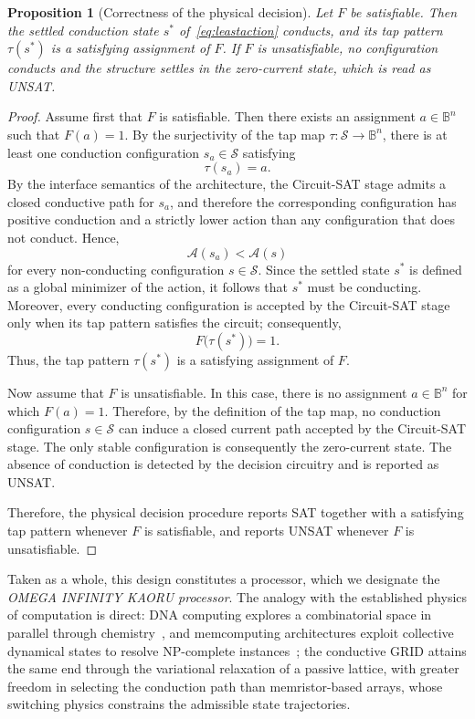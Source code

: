 \documentclass[letterpaper,journal]{IEEEtran}
\newtheorem{proposition}{Proposition}
\begin{document}
\begin{proposition}[Correctness of the physical decision]
\label{prop:correct}
Let $F$ be satisfiable. Then the settled conduction state $s^{*}$
of~\eqref{eq:leastaction} conducts, and its tap pattern $\tau(s^{*})$ is a
satisfying assignment of $F$. If $F$ is unsatisfiable, no configuration
conducts and the structure settles in the zero-current state, which is read
as UNSAT.
\end{proposition}

\begin{proof}
Assume first that $F$ is satisfiable. Then there exists an assignment
$a\in\mathbb{B}^{n}$ such that $F(a)=1$. By the surjectivity of the tap
map $\tau:\mathcal{S}\to\mathbb{B}^{n}$, there is at least one conduction
configuration $s_a\in\mathcal{S}$ satisfying
\[
\tau(s_a)=a.
\]
By the interface semantics of the architecture, the Circuit-SAT stage
admits a closed conductive path for $s_a$, and therefore the corresponding
configuration has positive conduction and a strictly lower action than any
configuration that does not conduct. Hence,
\[
\mathcal{A}(s_a)<\mathcal{A}(s)
\]
for every non-conducting configuration $s\in\mathcal{S}$. Since the settled
state $s^{*}$ is defined as a global minimizer of the action, it follows
that $s^{*}$ must be conducting. Moreover, every conducting configuration
is accepted by the Circuit-SAT stage only when its tap pattern satisfies
the circuit; consequently,
\[
F\bigl(\tau(s^{*})\bigr)=1.
\]
Thus, the tap pattern $\tau(s^{*})$ is a satisfying assignment of $F$.

Now assume that $F$ is unsatisfiable. In this case, there is no assignment
$a\in\mathbb{B}^{n}$ for which $F(a)=1$. Therefore, by the definition of
the tap map, no conduction configuration $s\in\mathcal{S}$ can induce a
closed current path accepted by the Circuit-SAT stage. The only stable
configuration is consequently the zero-current state. The absence of
conduction is detected by the decision circuitry and is reported as
\textsc{UNSAT}.

Therefore, the physical decision procedure reports \textsc{SAT} together
with a satisfying tap pattern whenever $F$ is satisfiable, and reports
\textsc{UNSAT} whenever $F$ is unsatisfiable.
\end{proof}


Taken as a whole, this design constitutes a processor, which we designate
the \emph{OMEGA INFINITY KAORU processor}. The analogy with the established
physics of computation is direct: DNA computing explores a combinatorial
space in parallel through chemistry~\cite{adleman1994}, and memcomputing
architectures exploit collective dynamical states to resolve NP-complete
instances~\cite{traversa2015,diventra2018}; the conductive GRID attains the
same end through the variational relaxation of a passive lattice, with
greater freedom in selecting the conduction path than memristor-based
arrays, whose switching physics constrains the admissible state
trajectories.
\end{document}

